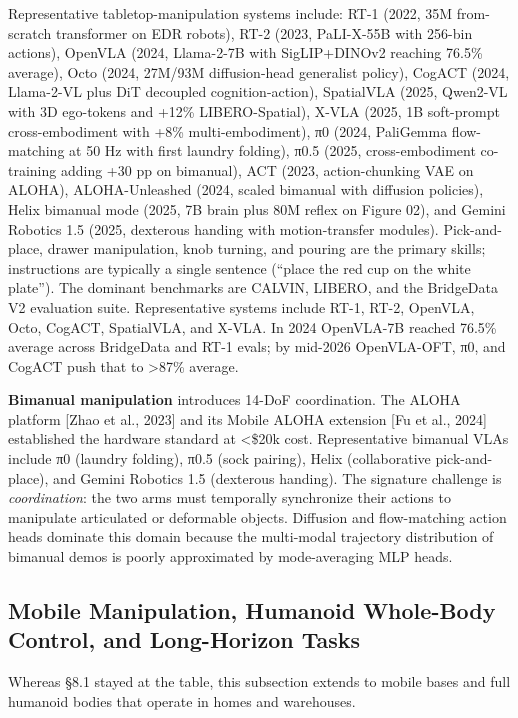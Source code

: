 Representative tabletop-manipulation systems include: RT-1 (2022, 35M from-scratch transformer on EDR robots), RT-2 (2023, PaLI-X-55B with 256-bin actions), OpenVLA (2024, Llama-2-7B with SigLIP+DINOv2 reaching 76.5\% average), Octo (2024, 27M/93M diffusion-head generalist policy), CogACT (2024, Llama-2-VL plus DiT decoupled cognition-action), SpatialVLA (2025, Qwen2-VL with 3D ego-tokens and +12\% LIBERO-Spatial), X-VLA (2025, 1B soft-prompt cross-embodiment with +8\% multi-embodiment), π0 (2024, PaliGemma flow-matching at 50 Hz with first laundry folding), π0.5 (2025, cross-embodiment co-training adding +30 pp on bimanual), ACT (2023, action-chunking VAE on ALOHA), ALOHA-Unleashed (2024, scaled bimanual with diffusion policies), Helix bimanual mode (2025, 7B brain plus 80M reflex on Figure 02), and Gemini Robotics 1.5 (2025, dexterous handing with motion-transfer modules). Pick-and-place, drawer manipulation, knob turning, and pouring are the primary skills; instructions are typically a single sentence (``place the red cup on the white plate''). The dominant benchmarks are CALVIN, LIBERO, and the BridgeData V2 evaluation suite. Representative systems include RT-1, RT-2, OpenVLA, Octo, CogACT, SpatialVLA, and X-VLA. In 2024 OpenVLA-7B reached 76.5\% average across BridgeData and RT-1 evals; by mid-2026 OpenVLA-OFT, π0, and CogACT push that to \textgreater87\% average.

\textbf{Bimanual manipulation} introduces 14-DoF coordination. The ALOHA platform {[}Zhao et al., 2023{]} and its Mobile ALOHA extension {[}Fu et al., 2024{]} established the hardware standard at \textless\$20k cost. Representative bimanual VLAs include π0 (laundry folding), π0.5 (sock pairing), Helix (collaborative pick-and-place), and Gemini Robotics 1.5 (dexterous handing). The signature challenge is \emph{coordination}: the two arms must temporally synchronize their actions to manipulate articulated or deformable objects. Diffusion and flow-matching action heads dominate this domain because the multi-modal trajectory distribution of bimanual demos is poorly approximated by mode-averaging MLP heads.

\subsection{Mobile Manipulation, Humanoid Whole-Body Control, and Long-Horizon Tasks}\label{mobile-manipulation-humanoid-whole-body-control-and-long-horizon-tasks}

Whereas §8.1 stayed at the table, this subsection extends to mobile bases and full humanoid bodies that operate in homes and warehouses.

